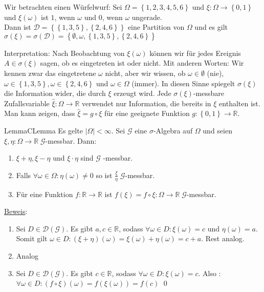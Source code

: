 \documentclass[11.5 pt, a4paper]{memoir}
\begin{document}
Wir betrachten einen Würfelwurf: Sei $ \Omega  = \left\{ 1, 2, 3,4,5,6 \right\} $ und $ \xi : \Omega  \to \left\{ 0 ,1 \right\} $ und 
$ \xi ( \omega ) $ ist $ 1 $, wenn $ \omega  $ und $ 0 $, wenn $ \omega  $ ungerade. \\
Dann ist $ \mathcal{D} = \left\{ \left\{ 1,3,5 \right\}, \left\{ 2,4,6 \right\} \right\} $ eine Partition von $ \Omega  $ und es gilt 
$ \sigma (\xi) = \sigma( \mathcal{D}) = \left\{ \emptyset, \omega , \left\{ 1,3,5 \right\}, \left\{ 2,4,6 \right\} \right\} $ 

Interpretation:  Nach Beobachtung von $ \xi (\omega ) $ können wir für jedes Ereignis $ A \in \sigma (\xi) $ sagen, ob es eingetreten ist oder nicht. Mit anderen Worten: Wir kennen zwar das eingetretene $ \omega  $ nicht, aber wir wissen, ob $ \omega  \in \emptyset $ (nie), $ \omega  \in \left\{ 1,3,5 \right\}, \omega \in \left\{ 2,4,6 \right\} $ und $ \omega  \in \Omega  $ (immer). In diesen Sinne spiegelt 
$ \sigma (\xi) $ die Information wider, die durch $ \xi $ erzeugt wird. Jede $ \sigma (\xi) $-messbare Zufallsvariable $ \hat{\xi}: \Omega  \to \mathbb{R} $ verwendet nur Information, die bereits in $ \xi $ enthalten ist. Man kann zeigen, dass $ \hat{\xi} = g \circ \xi $ für eine geeignete Funktion $ g : \left\{ 0 ,1 \right\} \to \mathbb{R} $.

\begin{ibox}[1.17]{Lemma}{CLemma}
  Es gelte $ \left| \Omega  \right| < \infty $. Sei $ \mathcal{G} $ eine $ \sigma $-Algebra auf $ \Omega $ und seien $ \xi , \eta :
	\Omega \to \mathbb{R} \; \mathcal{G}$-messbar. Dann:
	\begin{enumerate}[label=\alph*)]
		\item $ \xi + \eta, \xi - \eta \text{ und } \xi \cdot \eta $ sind $ \mathcal{G} $ -messbar.
		\item Falls $ \forall \omega \in \Omega : \eta (\omega ) \neq 0 $ so ist $ \frac{\xi}{\eta} \; \mathcal{G} $-messbar.
		\item Für eine Funktion $ f : \mathbb{R} \to \mathbb{R} $ ist $ f (\xi) = f \circ \xi : \Omega  \to \mathbb{R} \; \mathcal{G} $-messbar.
	\end{enumerate}
\end{ibox}
	\underline{Beweis}: 
	\begin{enumerate}[label=\alph*)]
		\item Sei $ D \in \mathcal{D} ( \mathcal{G} ) $. Es gibt $ a, c \in \mathbb{R} $, sodass $ \forall \omega  \in D: \xi ( \omega ) = c \text{ und } \eta (\omega ) = a$. Somit gilt $ \omega  \in D: \left(  \xi + \eta  \right) (\omega ) = \xi (\omega ) + \eta (\omega ) = c + a$. Rest analog.
		\item Analog
		\item Sei $ D \in \mathcal{D} \left( \mathcal{G} \right). $ Es gibt $ c \in \mathbb{R} $, sodass $ \forall \omega \in D : \xi  (\omega ) = c $. Also : $ \forall \omega \in D: \left( f \circ \xi \right)  (\omega ) = f \left( \xi  (\omega ) \right) = f (c) $ \qed
	\end{enumerate}
\end{document}
